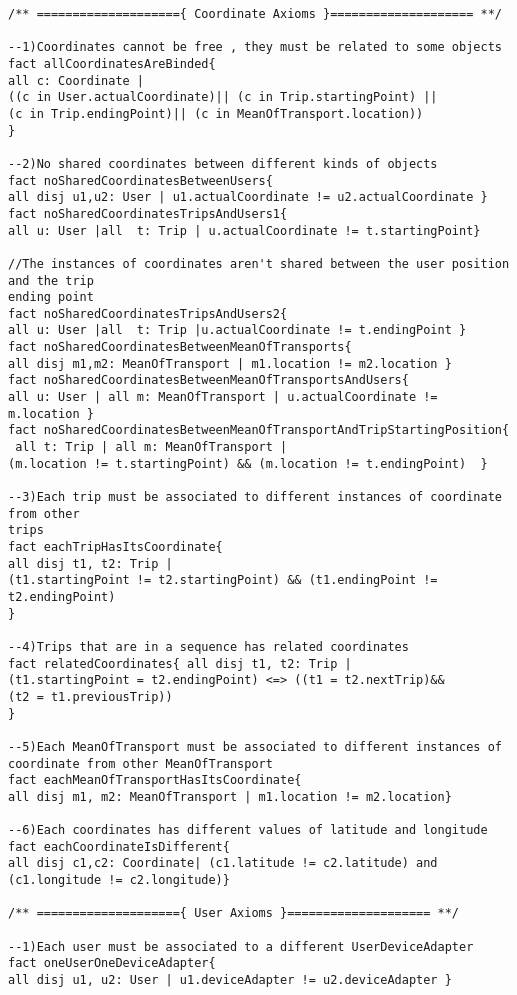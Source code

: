 \documentclass[a4paper,leqno]{book}
\begin{document}
\begin{lstlisting}
/** ===================={ Coordinate Axioms }==================== **/

--1)Coordinates cannot be free , they must be related to some objects
fact allCoordinatesAreBinded{
all c: Coordinate |
((c in User.actualCoordinate)|| (c in Trip.startingPoint) ||
(c in Trip.endingPoint)|| (c in MeanOfTransport.location))
}

--2)No shared coordinates between different kinds of objects
fact noSharedCoordinatesBetweenUsers{
all disj u1,u2: User | u1.actualCoordinate != u2.actualCoordinate }
fact noSharedCoordinatesTripsAndUsers1{	
all u: User |all  t: Trip | u.actualCoordinate != t.startingPoint}

//The instances of coordinates aren't shared between the user position and the trip
ending point
fact noSharedCoordinatesTripsAndUsers2{
all u: User |all  t: Trip |u.actualCoordinate != t.endingPoint }
fact noSharedCoordinatesBetweenMeanOfTransports{ 
all disj m1,m2: MeanOfTransport | m1.location != m2.location }
fact noSharedCoordinatesBetweenMeanOfTransportsAndUsers{
all u: User | all m: MeanOfTransport | u.actualCoordinate != m.location }
fact noSharedCoordinatesBetweenMeanOfTransportAndTripStartingPosition{
 all t: Trip | all m: MeanOfTransport |
(m.location != t.startingPoint) && (m.location != t.endingPoint)  }

--3)Each trip must be associated to different instances of coordinate from other
trips
fact eachTripHasItsCoordinate{
all disj t1, t2: Trip |
(t1.startingPoint != t2.startingPoint) && (t1.endingPoint != t2.endingPoint)
}

--4)Trips that are in a sequence has related coordinates
fact relatedCoordinates{ all disj t1, t2: Trip |
(t1.startingPoint = t2.endingPoint) <=> ((t1 = t2.nextTrip)&&
(t2 = t1.previousTrip))
}

--5)Each MeanOfTransport must be associated to different instances of
coordinate from other MeanOfTransport
fact eachMeanOfTransportHasItsCoordinate{ 
all disj m1, m2: MeanOfTransport | m1.location != m2.location}

--6)Each coordinates has different values of latitude and longitude
fact eachCoordinateIsDifferent{ 
all disj c1,c2: Coordinate| (c1.latitude != c2.latitude) and 
(c1.longitude != c2.longitude)}

/** ===================={ User Axioms }==================== **/

--1)Each user must be associated to a different UserDeviceAdapter
fact oneUserOneDeviceAdapter{ 
all disj u1, u2: User | u1.deviceAdapter != u2.deviceAdapter }


\end{lstlisting}
\end{document}
